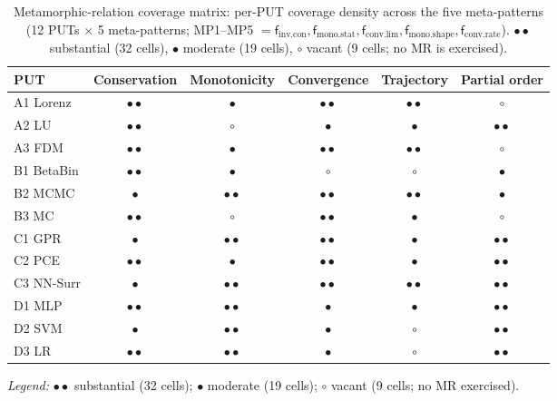 \documentclass[manuscript,screen,review]{acmart}
\begin{document}
{%
\small
\begin{longtable}[]{@{}lccccc@{}}
\caption{Metamorphic-relation coverage matrix: per-PUT coverage density across the five meta-patterns (12 PUTs $\times$ 5 meta-patterns; MP1--MP5 $= \mathsf{f}_{\mathrm{inv.con}}, \mathsf{f}_{\mathrm{mono.stat}}, \mathsf{f}_{\mathrm{conv.lim}}, \mathsf{f}_{\mathrm{mono.shape}}, \mathsf{f}_{\mathrm{conv.rate}}$). $\bullet\bullet$ substantial (32 cells), $\bullet$ moderate (19 cells), $\circ$ vacant (9 cells; no MR is exercised).}\label{tab:p2-cells}\\
\toprule\noalign{}
PUT & Conservation & Monotonicity & Convergence & Trajectory & Partial order \\
\midrule\noalign{}
\endfirsthead
\endhead
\bottomrule\noalign{}
\endlastfoot
A1 Lorenz  & $\bullet\bullet$ & $\bullet$ & $\bullet\bullet$ & $\bullet\bullet$ & $\circ$ \\
A2 LU      & $\bullet\bullet$ & $\circ$ & $\bullet$ & $\bullet$ & $\bullet\bullet$ \\
A3 FDM     & $\bullet\bullet$ & $\bullet$ & $\bullet\bullet$ & $\bullet\bullet$ & $\circ$ \\
B1 BetaBin & $\bullet\bullet$ & $\bullet$ & $\circ$ & $\circ$ & $\bullet$ \\
B2 MCMC    & $\bullet$ & $\bullet\bullet$ & $\bullet\bullet$ & $\bullet\bullet$ & $\bullet$ \\
B3 MC      & $\bullet\bullet$ & $\circ$ & $\bullet\bullet$ & $\bullet$ & $\circ$ \\
C1 GPR     & $\bullet$ & $\bullet\bullet$ & $\bullet\bullet$ & $\bullet$ & $\bullet\bullet$ \\
C2 PCE     & $\bullet\bullet$ & $\bullet$ & $\bullet\bullet$ & $\bullet$ & $\bullet\bullet$ \\
C3 NN-Surr & $\bullet$ & $\bullet\bullet$ & $\bullet\bullet$ & $\bullet\bullet$ & $\bullet\bullet$ \\
D1 MLP     & $\bullet\bullet$ & $\bullet\bullet$ & $\bullet$ & $\bullet$ & $\bullet\bullet$ \\
D2 SVM     & $\bullet$ & $\bullet\bullet$ & $\bullet$ & $\circ$ & $\bullet\bullet$ \\
D3 LR      & $\bullet\bullet$ & $\bullet\bullet$ & $\bullet$ & $\circ$ & $\bullet\bullet$ \\
\end{longtable}
}

\noindent\emph{Legend:} $\bullet\bullet$ substantial (32 cells); $\bullet$ moderate (19 cells); $\circ$ vacant (9 cells; no MR exercised).
\end{document}
